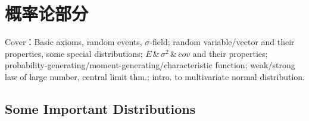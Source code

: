 \section{概率论部分}\label{Section1Probability}
    Cover：Basic axioms, random events, $\sigma$-field; random variable/vector and their properties, some special distributions; $E$\,\&\,$\sigma^2$\,\&\,$cov$ and their properties; probability-generating/moment-generating/characteristic function; weak/strong law of large number, central limit thm.; intro. to multivariate normal distribution.



\subsection{Some Important Distributions}\label{SectionImportantDistributions}

